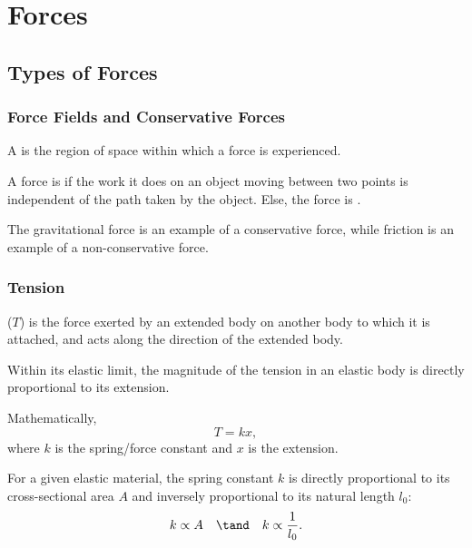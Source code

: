 \chapter{Forces}

\section{Types of Forces}

\subsection{Force Fields and Conservative Forces}

\begin{definition}
    A  is the region of space within which a force is experienced.
\end{definition}

\begin{definition}
    A force is  if the work it does on an object moving between two points is independent of the path taken by the object. Else, the force is .
\end{definition}

The gravitational force is an example of a conservative force, while friction is an example of a non-conservative force.

\subsection{Tension}

\begin{definition}
     ($T$) is the force exerted by an extended body on another body to which it is attached, and acts along the direction of the extended body.
\end{definition}

\begin{law}
    Within its elastic limit, the magnitude of the tension in an elastic body is directly proportional to its extension.
\end{law}

Mathematically, \[T = kx,\] where $k$ is the spring/force constant and $x$ is the extension.

For a given elastic material, the spring constant $k$ is directly proportional to its cross-sectional area $A$ and inversely proportional to its natural length $l_0$: \[k \propto A \quad \tand \quad k \propto \frac1{l_0}.\]

